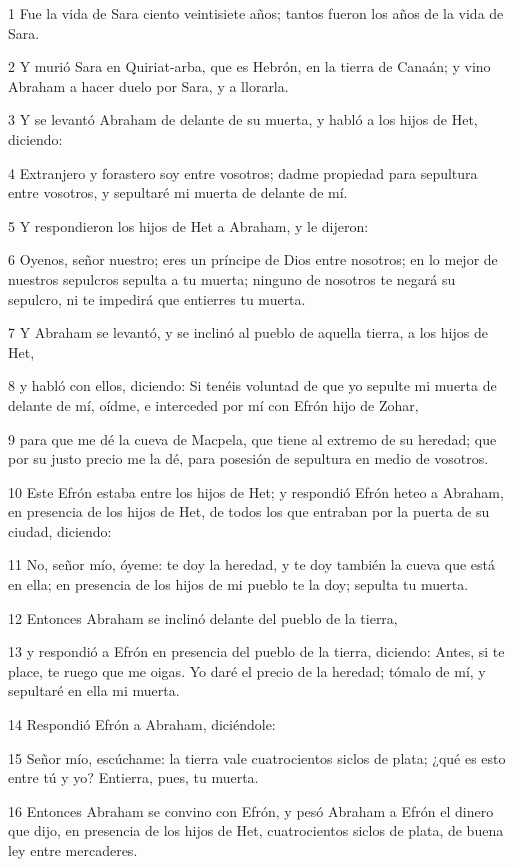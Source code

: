 \par 1 Fue la vida de Sara ciento veintisiete años; tantos fueron los años de la vida de Sara.
\par 2 Y murió Sara en Quiriat-arba, que es Hebrón, en la tierra de Canaán; y vino Abraham a hacer duelo por Sara, y a llorarla.
\par 3 Y se levantó Abraham de delante de su muerta, y habló a los hijos de Het, diciendo:
\par 4 Extranjero y forastero soy entre vosotros; dadme propiedad para sepultura entre vosotros, y sepultaré mi muerta de delante de mí.
\par 5 Y respondieron los hijos de Het a Abraham, y le dijeron:
\par 6 Oyenos, señor nuestro; eres un príncipe de Dios entre nosotros; en lo mejor de nuestros sepulcros sepulta a tu muerta; ninguno de nosotros te negará su sepulcro, ni te impedirá que entierres tu muerta.
\par 7 Y Abraham se levantó, y se inclinó al pueblo de aquella tierra, a los hijos de Het,
\par 8 y habló con ellos, diciendo: Si tenéis voluntad de que yo sepulte mi muerta de delante de mí, oídme, e interceded por mí con Efrón hijo de Zohar,
\par 9 para que me dé la cueva de Macpela, que tiene al extremo de su heredad; que por su justo precio me la dé, para posesión de sepultura en medio de vosotros.
\par 10 Este Efrón estaba entre los hijos de Het; y respondió Efrón heteo a Abraham, en presencia de los hijos de Het, de todos los que entraban por la puerta de su ciudad, diciendo:
\par 11 No, señor mío, óyeme: te doy la heredad, y te doy también la cueva que está en ella; en presencia de los hijos de mi pueblo te la doy; sepulta tu muerta.
\par 12 Entonces Abraham se inclinó delante del pueblo de la tierra,
\par 13 y respondió a Efrón en presencia del pueblo de la tierra, diciendo: Antes, si te place, te ruego que me oigas. Yo daré el precio de la heredad; tómalo de mí, y sepultaré en ella mi muerta.
\par 14 Respondió Efrón a Abraham, diciéndole:
\par 15 Señor mío, escúchame: la tierra vale cuatrocientos siclos de plata; ¿qué es esto entre tú y yo? Entierra, pues, tu muerta.
\par 16 Entonces Abraham se convino con Efrón, y pesó Abraham a Efrón el dinero que dijo, en presencia de los hijos de Het, cuatrocientos siclos de plata, de buena ley entre mercaderes.
